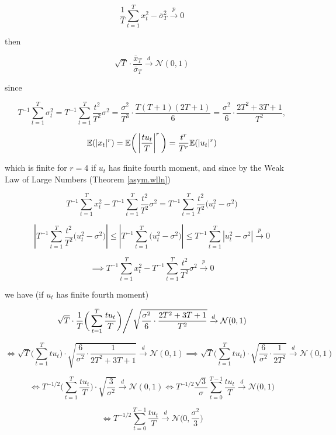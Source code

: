 \begin{enumerate}[(a)]
{{\[
\frac{1}{T} \sum_{t=1}^T x_t^2 - \overline{\sigma}_T^2 \xrightarrow{p} 0
\]

then 

\[
\sqrt{T} \cdot \frac{\overline{x}_T }{ \overline{\sigma}_T} \xrightarrow{d} \mathcal{N}(0, 1)
\]
}
}

since

\[
T^{-1} \sum_{t=1}^T \sigma_t^2 = T^{-1} \sum_{t=1}^T  \frac{t^2}{T^2} \sigma^2 = \frac{\sigma^2}{T^3} \cdot \frac{T(T+1)(2T+1)}{6} = \frac{\sigma^2}{6} \cdot \frac{2T^2 + 3T + 1}{T^2},
\]

\[
\mathbb{E}(|x_t|^r) = \mathbb{E}\bigg( \left| \frac{ t u_{t}}{T} \right| ^r \bigg) = \frac{t^r}{T^r} \mathbb{E}(|u_t|^r) 
\]

which is finite for \(r=4\) if \(u_t\) has finite fourth moment, and since by the Weak Law of Large Numbers (Theorem \ref{asym.wlln})

\[
T^{-1}\sum_{t=1}^T x_t^2 -  T^{-1} \sum_{t=1}^T  \frac{t^2}{T^2} \sigma^2 = T^{-1} \sum_{t=1}^T \frac{t^2}{T^2} \big( u_t^2 - \sigma^2\big)  
\]

\[
\left| T^{-1} \sum_{t=1}^T \frac{t^2}{T^2} \big( u_t^2 - \sigma^2\big)   \right| \leq \left| T^{-1} \sum_{t=1}^T  \big( u_t^2 - \sigma^2\big) \right| \leq T^{-1} \sum_{t=1}^T   \left|  u_t^2 - \sigma^2 \right| \xrightarrow{p} 0
\]

\[
\implies T^{-1}\sum_{t=1}^T x_t^2 -  T^{-1} \sum_{t=1}^T  \frac{t^2}{T^2} \sigma^2 \xrightarrow{p} 0
\]

we have (if \(u_t\) has finite fourth moment)

\[
\left. \sqrt{T} \cdot \frac{1}{T} \bigg( \sum_{t=1}^T \frac{t u_t}{T} \bigg) \middle/\sqrt{  \frac{\sigma^2}{6} \cdot \frac{2T^2 + 3T + 1}{T^2} }  \xrightarrow{d} \mathcal{N}(0, 1) \right.
\]

\[
\iff  \sqrt{T}  \bigg( \sum_{t=1}^T t u_t \bigg) \cdot \sqrt{ \frac{6}{\sigma^2} \cdot \frac{1}{2T^2 + 3T + 1}}  \xrightarrow{d} \mathcal{N}(0, 1) \implies  \sqrt{T}  \bigg( \sum_{t=1}^T t u_t \bigg) \cdot \sqrt{ \frac{6}{\sigma^2} \cdot \frac{1}{2T^2 } }  \xrightarrow{d} \mathcal{N}(0, 1)
\]


\[
\iff  T^{-1/2} \bigg( \sum_{t=1}^T \frac{t u_t}{T} \bigg) \cdot \sqrt{ \frac{3}{\sigma^2}  }   \xrightarrow{d} \mathcal{N}(0, 1) \iff T^{-1/2} \frac{\sqrt{3}}{\sigma} \sum_{t=0}^{T-1} \frac{ t u_{t}}{T}   \xrightarrow{d} \mathcal{N}\bigg(0, 1\bigg)
\]



\begin{equation}\label{ts.hw4.3b.dist}
\iff T^{-1/2} \sum_{t=0}^{T-1} \frac{ t u_{t}}{T}   \xrightarrow{d} \mathcal{N}\bigg(0, \frac{\sigma^2}{3} \bigg)
\end{equation}


\end{enumerate}
